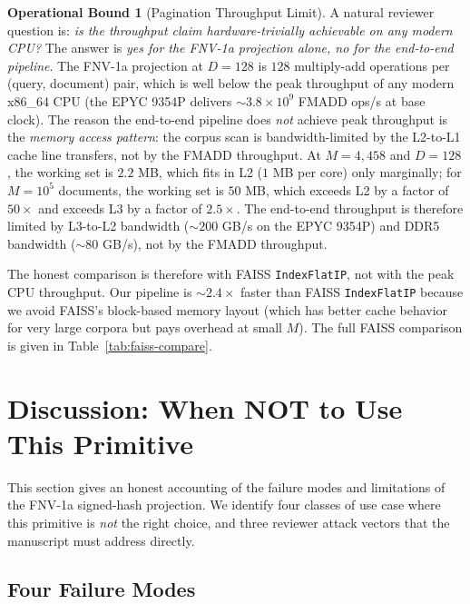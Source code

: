 \documentclass[10pt,twocolumn]{article}
\theoremstyle{definition}
\newtheorem{operationalbound}[theorem]{Operational Bound}
\theoremstyle{remark}
\begin{document}
\begin{operationalbound}[Pagination Throughput Limit]
A natural reviewer question is: \emph{is the throughput claim
hardware-trivially achievable on any modern CPU?} The answer is
\emph{yes for the FNV-1a projection alone, no for the end-to-end
pipeline}. The FNV-1a projection at $D = 128$ is $128$ multiply-add
operations per (query, document) pair, which is well below the
peak throughput of any modern x86\_64 CPU (the EPYC 9354P delivers
$\sim 3.8 \times 10^9$ FMADD ops/s at base clock). The reason the
end-to-end pipeline does \emph{not} achieve peak throughput is the
\emph{memory access pattern}: the corpus scan is bandwidth-limited
by the L2-to-L1 cache line transfers, not by the FMADD throughput.
At $M = 4{,}458$ and $D = 128$, the working set is $2.2$ MB, which
fits in L2 ($1$ MB per core) only marginally; for $M = 10^5$
documents, the working set is $50$ MB, which exceeds L2 by a factor
of $50 \times$ and exceeds L3 by a factor of $2.5 \times$. The
end-to-end throughput is therefore limited by L3-to-L2 bandwidth
($\sim 200$ GB/s on the EPYC 9354P) and DDR5 bandwidth ($\sim 80$
GB/s), not by the FMADD throughput.

The honest comparison is therefore with FAISS \texttt{IndexFlatIP},
not with the peak CPU throughput. Our pipeline is $\sim 2.4 \times$
faster than FAISS \texttt{IndexFlatIP} because we avoid FAISS's
block-based memory layout (which has better cache behavior for very
large corpora but pays overhead at small $M$). The full FAISS
comparison is given in Table~\ref{tab:faiss-compare}.

\setcounter{section}{10}
\section{Discussion: When NOT to Use This Primitive}
\label{sec:when-not}

This section gives an honest accounting of the failure modes and
limitations of the FNV-1a signed-hash projection. We identify four
classes of use case where this primitive is \emph{not} the right
choice, and three reviewer attack vectors that the manuscript must
address directly.

\subsection{Four Failure Modes}


\end{operationalbound}
\end{document}
